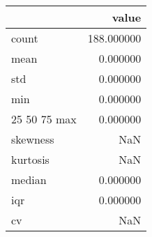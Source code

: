 \begin{tabular}{lr}
\toprule
 & value \\
\midrule
count & 188.000000 \\
mean & 0.000000 \\
std & 0.000000 \\
min & 0.000000 \\
25%
50%
75%
max & 0.000000 \\
skewness & NaN \\
kurtosis & NaN \\
median & 0.000000 \\
iqr & 0.000000 \\
cv & NaN \\
\bottomrule
\end{tabular}
